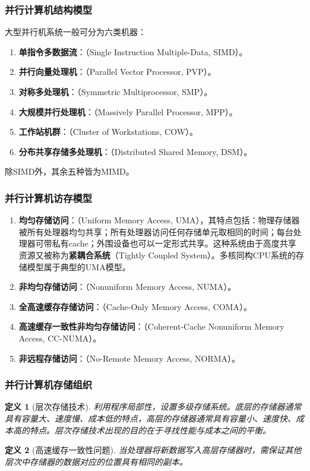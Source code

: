 \documentclass{article}
\newtheorem{definition}{定义}[section]
\begin{document}
			\subsubsection{并行计算机结构模型}
				大型并行机系统一般可分为六类机器：
				\begin{enumerate}
					\item \textbf{单指令多数据流}：（Single Instruction Multiple-Data, SIMD）。
					\item \textbf{并行向量处理机}：（Parallel Vector Processor, PVP）。
					\item \textbf{对称多处理机}：（Symmetric Multiprocessor, SMP）。
					\item \textbf{大规模并行处理机}：（Massively Parallel Processor, MPP）。
					\item \textbf{工作站机群}：（Cluster of Workstations, COW）。
					\item \textbf{分布共享存储多处理机}：（Distributed Shared Memory, DSM）。
				\end{enumerate}
				除SIMD外，其余五种皆为MIMD。
			\subsubsection{并行计算机访存模型}
				\begin{enumerate}
					\item \textbf{均匀存储访问}：（Uniform Memory Access, UMA），其特点包括：物理存储器被所有处理器均匀共享；所有处理器访问任何存储单元取相同的时间；每台处理器可带私有cache；外围设备也可以一定形式共享。这种系统由于高度共享资源又被称为\textbf{紧耦合系统}（Tightly Coupled System）。多核同构CPU系统的存储模型属于典型的UMA模型。
					\item \textbf{非均匀存储访问}：（Nonuniform Memory Access, NUMA）。
					\item \textbf{全高速缓存存储访问}：（Cache-Only Memory Access, COMA）。
					\item \textbf{高速缓存一致性非均匀存储访问}：（Coherent-Cache Nonuniform Memory Access, CC-NUMA）。
					\item \textbf{非远程存储访问}：（No-Remote Memory Access, NORMA）。
				\end{enumerate}
			\subsubsection{并行计算机存储组织}
				\begin{definition}[层次存储技术]
					利用程序局部性，设置多级存储系统。底层的存储器通常具有容量大、速度慢、成本低的特点，高层的存储器通常具有容量小、速度快、成本高的特点。层次存储技术出现的目的在于寻找性能与成本之间的平衡。
				\end{definition}
				\begin{definition}[高速缓存一致性问题]
					当处理器将新数据写入高层存储器时，需保证其他层次中存储器的数据对应的位置具有相同的副本。
				\end{definition}
\end{document}
